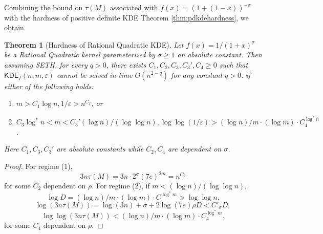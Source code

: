 \documentclass[10pt,a4paper]{article}
\newtheorem{theorem}{Theorem}
\theoremstyle{remark}
\numberwithin{equation}{section}
\numberwithin{theorem}{section}
\newcommand{\eps}{\varepsilon}
\newcommand{\KDE}{\mathsf{KDE}}
\begin{document}
Combining the bound on $\tau(M)$ associated with $f(x) = (1 + (1-x))^{-\sigma}$ with the hardness of positive definite KDE Theorem \ref{thm:pdkdehardness}, we obtain
\begin{theorem}[Hardness of Rational Quadratic KDE]
Let $f(x) = 1/(1+x)^\sigma$ be a Rational Quadratic kernel parameterized by $\sigma \ge 1$ an absolute constant.
Then assuming SETH, for every $q > 0$, there exists $C_1, C_2, C_3, C_3', C_4 \ge 0$ such that $\KDE_f(n, m, \eps)$ cannot be solved in time $O(n^{2-q})$ for any constant $q>0$. if either of the following holds:
\begin{enumerate}[(1)]
\item $m > C_1\log n, 1/\eps > n^{C_2}$, or
\item $C_3\log^* n < m < C_3'(\log n)/(\log\log n), \log\log(1/\eps) > (\log n)/m \cdot (\log m) \cdot C_4^{\log^*n}$.
\end{enumerate}
Here $C_1, C_3, C_3'$ are absolute constants while $C_2, C_4$ are dependent on $\sigma$.
\end{theorem}
\begin{proof}
For regime (1), 
\[3n\tau(M) = 3n\cdot 2^{\sigma}(7e)^{2m} = n^{C_2}\]
for some $C_2$ dependent on $\rho$. For regime (2), if $m < (\log n)/(\log \log n)$,
\[\log D = (\log n)/m \cdot (\log m) \cdot C^{\log^* m} > \log \log n.\]
\[\log(3n\tau(M)) = \log(3n) + \sigma + 2\log(7e)\rho D < C'_\sigma D,\]
\[\log\log(3n\tau(M)) < (\log n)/m \cdot (\log m) \cdot C_4^{\log^* m}.\]
for some $C_4$ dependent on $\rho$.
\end{proof}
\end{document}
